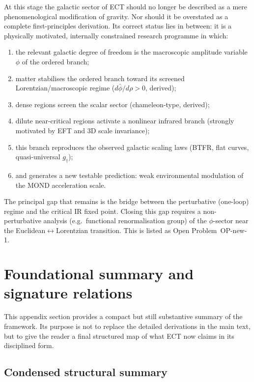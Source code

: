 \documentclass[11pt,a4paper]{article}
\numberwithin{equation}{section}
\begin{document}
At this stage the galactic sector of ECT should no longer be
described as a mere phenomenological modification of gravity.
Nor should it be overstated as a complete first-principles
derivation. Its correct status lies in between: it is a
physically motivated, internally constrained research programme
in which:
\begin{enumerate}
\item the relevant galactic degree of freedom is the
  macroscopic amplitude variable $\phi$ of the ordered branch;
\item matter stabilises the ordered branch toward its screened Lorentzian/macroscopic regime
  ($d\bar\phi/d\rho > 0$, derived);
\item dense regions screen the scalar sector
  (chameleon-type, derived);
\item dilute near-critical regions activate a nonlinear
  infrared branch (strongly motivated by EFT and 3D scale
  invariance);
\item this branch reproduces the observed galactic scaling laws
  (BTFR, flat curves, quasi-universal $g_\dagger$);
\item and generates a new testable prediction: weak
  environmental modulation of the MOND acceleration scale.
\end{enumerate}

The principal gap that remains is the bridge between the
perturbative (one-loop) regime and the critical IR fixed point.
Closing this gap requires a non-perturbative analysis
(e.g.\ functional renormalisation group) of the $\phi$-sector
near the Euclidean$\leftrightarrow$Lorentzian transition.
This is listed as Open Problem~OP-new-1.


\section{Foundational summary and signature relations}
\label{app:laws_and_eqs}

This appendix section provides a compact but still substantive summary
of the framework.
Its purpose is not to replace the detailed derivations in the main text,
but to give the reader a final structured map of what ECT now claims in
its disciplined form.

\subsection{Condensed structural summary}
\label{sec:laws_ect}
\end{document}
